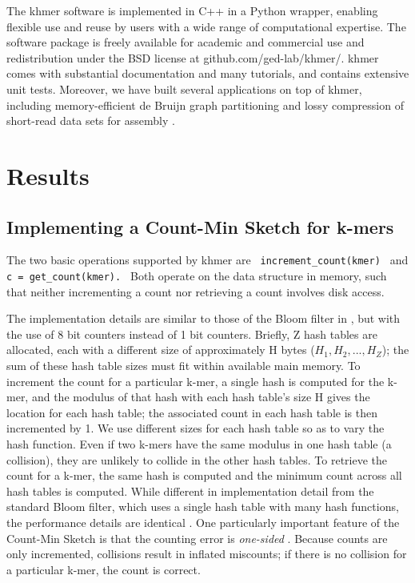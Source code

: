 \documentclass[10pt]{article}
\begin{document}
The khmer software \cite{khmer} is implemented in C++ in a Python
wrapper, enabling flexible use and reuse by users with a wide range of
computational expertise.  The software package is freely available for
academic and commercial use and redistribution under the BSD license
at github.com/ged-lab/khmer/.  khmer comes with substantial
documentation and many tutorials, and contains extensive unit tests.
Moreover, we have built several applications on top of khmer,
including memory-efficient de Bruijn graph partitioning
\cite{Pell2012} and lossy compression of short-read data sets for
assembly \cite{Brown2012}.

\section*{Results}

\subsection*{Implementing a Count-Min Sketch for k-mers}

The two basic operations supported by khmer are {\tt
  increment\_count(kmer) } and {\tt c = get\_count(kmer). } Both
operate on the data structure in memory, such that neither
incrementing a count nor retrieving a count involves disk access.

The implementation details are similar to those of the Bloom filter in
\cite{Pell2012}, but with the use of 8 bit counters instead of 1 bit
counters.  Briefly, Z hash tables are allocated, each with a different
size of approximately H bytes ($H_1, H_2, ..., H_Z$); the sum of these
hash table sizes must fit within available main memory.  To increment
the count for a particular k-mer, a single hash is computed for the
k-mer, and the modulus of that hash with each hash table's size H
gives the location for each hash table; the associated count in each
hash table is then incremented by 1.  We use different sizes for each
hash table so as to vary the hash function.  Even if two k-mers have
the same modulus in one hash table (a collision), they are unlikely to
collide in the other hash tables.  To retrieve the count for a k-mer,
the same hash is computed and the minimum count across all hash tables
is computed. While different in implementation detail from the
standard Bloom filter, which uses a single hash table with many
hash functions, the performance details are identical \cite{Pell2012}.
% 
One particularly important feature of the Count-Min Sketch is that the
counting error is {\em one-sided} \cite{Cormode2005}.  Because counts
are only incremented, collisions result in inflated miscounts; if
there is no collision for a particular k-mer, the count is correct.
\end{document}
